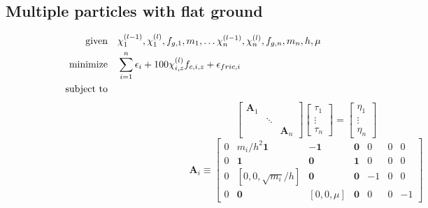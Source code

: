 \documentclass[a4paper,10pt]{article}
\begin{document}
\subsection{Multiple particles with flat ground}
\begin{align}
\text{given}      & \quad \chi^{(l-1)}_1, \chi^{(l)}_1, f_{g,1}, m_1,\dots
                          \chi^{(l-1)}_n, \chi^{(l)}_n, f_{g,n}, m_n,
                          h, \mu \notag\\
\text{minimize}   & \quad \sum_{i=1}^n \epsilon_i + 100\chi^{(l)}_{i,z} f_{c,i,z} + \epsilon_{fric,i} \notag\\
\text{subject to} & \quad\quad\quad\quad\quad\quad\quad\quad\quad\quad\quad\quad\quad\quad\quad
\quad\quad\quad\quad\quad\quad\quad\quad\quad\quad\quad\quad\quad\quad\quad
\quad\quad\quad\quad\quad\quad\quad\quad\quad\quad\quad\quad\quad\quad\quad \notag
\end{align}
\begin{equation}
\left[\begin{array}{ccc}
\mathbf{A}_1 &         &  \\
             & \ddots  &  \\
             &         & \mathbf{A}_n
\end{array}\right]
\left[\begin{array}{c}
\tau_1  \\
 \vdots \\
\tau_n
\end{array}\right]
=
\left[\begin{array}{c}
\eta_1  \\
 \vdots \\
\eta_n
\end{array}\right]
\end{equation}
\begin{equation}
\mathbf{A}_i \equiv
\left[\begin{array}{ccccccc}
0 & m_i/h^2\mathbf{1}     & -\mathbf{1}   & \mathbf{0} & 0 & 0 & 0 \\
0 &    \mathbf{1}         & \mathbf{0}    & \mathbf{1} & 0 & 0 & 0 \\
0 & [ 0, 0, \sqrt{m_i}/h] & \mathbf{0}    & \mathbf{0} & -1 & 0 & 0 \\
0 & \mathbf{0}            & [ 0, 0, \mu ] & \mathbf{0} & 0 & 0 & -1
\end{array}\right]
\end{equation}
\end{document}
